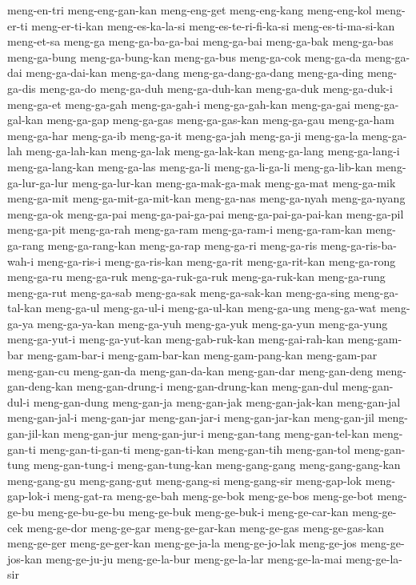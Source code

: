 {meng-en-tri meng-eng-gan-kan meng-eng-get meng-eng-kang meng-eng-kol
meng-er-ti meng-er-ti-kan meng-es-ka-la-si meng-es-te-ri-fi-ka-si
meng-es-ti-ma-si-kan meng-et-sa meng-ga meng-ga-ba-ga-bai meng-ga-bai
meng-ga-bak meng-ga-bas meng-ga-bung meng-ga-bung-kan meng-ga-bus
meng-ga-cok meng-ga-da meng-ga-dai meng-ga-dai-kan meng-ga-dang
meng-ga-dang-ga-dang meng-ga-ding meng-ga-dis meng-ga-do meng-ga-duh
meng-ga-duh-kan meng-ga-duk meng-ga-duk-i meng-ga-et meng-ga-gah
meng-ga-gah-i meng-ga-gah-kan meng-ga-gai meng-ga-gal-kan meng-ga-gap
meng-ga-gas meng-ga-gas-kan meng-ga-gau meng-ga-ham meng-ga-har meng-ga-ib
meng-ga-it meng-ga-jah meng-ga-ji meng-ga-la meng-ga-lah meng-ga-lah-kan
meng-ga-lak meng-ga-lak-kan meng-ga-lang meng-ga-lang-i meng-ga-lang-kan
meng-ga-las meng-ga-li meng-ga-li-ga-li meng-ga-lib-kan meng-ga-lur-ga-lur
meng-ga-lur-kan meng-ga-mak-ga-mak meng-ga-mat meng-ga-mik meng-ga-mit
meng-ga-mit-ga-mit-kan meng-ga-nas meng-ga-nyah meng-ga-nyang meng-ga-ok
meng-ga-pai meng-ga-pai-ga-pai meng-ga-pai-ga-pai-kan meng-ga-pil
meng-ga-pit meng-ga-rah meng-ga-ram meng-ga-ram-i meng-ga-ram-kan
meng-ga-rang meng-ga-rang-kan meng-ga-rap meng-ga-ri meng-ga-ris
meng-ga-ris-ba-wah-i meng-ga-ris-i meng-ga-ris-kan meng-ga-rit
meng-ga-rit-kan meng-ga-rong meng-ga-ru meng-ga-ruk meng-ga-ruk-ga-ruk
meng-ga-ruk-kan meng-ga-rung meng-ga-rut meng-ga-sab meng-ga-sak
meng-ga-sak-kan meng-ga-sing meng-ga-tal-kan meng-ga-ul meng-ga-ul-i
meng-ga-ul-kan meng-ga-ung meng-ga-wat meng-ga-ya meng-ga-ya-kan
meng-ga-yuh meng-ga-yuk meng-ga-yun meng-ga-yung meng-ga-yut-i
meng-ga-yut-kan meng-gab-ruk-kan meng-gai-rah-kan meng-gam-bar
meng-gam-bar-i meng-gam-bar-kan meng-gam-pang-kan meng-gam-par meng-gan-cu
meng-gan-da meng-gan-da-kan meng-gan-dar meng-gan-deng meng-gan-deng-kan
meng-gan-drung-i meng-gan-drung-kan meng-gan-dul meng-gan-dul-i
meng-gan-dung meng-gan-ja meng-gan-jak meng-gan-jak-kan meng-gan-jal
meng-gan-jal-i meng-gan-jar meng-gan-jar-i meng-gan-jar-kan meng-gan-jil
meng-gan-jil-kan meng-gan-jur meng-gan-jur-i meng-gan-tang
meng-gan-tel-kan meng-gan-ti meng-gan-ti-gan-ti meng-gan-ti-kan
meng-gan-tih meng-gan-tol meng-gan-tung meng-gan-tung-i meng-gan-tung-kan
meng-gang-gang meng-gang-gang-kan meng-gang-gu meng-gang-gut meng-gang-si
meng-gang-sir meng-gap-lok meng-gap-lok-i meng-gat-ra meng-ge-bah
meng-ge-bok meng-ge-bos meng-ge-bot meng-ge-bu meng-ge-bu-ge-bu
meng-ge-buk meng-ge-buk-i meng-ge-car-kan meng-ge-cek meng-ge-dor
meng-ge-gar meng-ge-gar-kan meng-ge-gas meng-ge-gas-kan meng-ge-ger
meng-ge-ger-kan meng-ge-ja-la meng-ge-jo-lak meng-ge-jos meng-ge-jos-kan
meng-ge-ju-ju meng-ge-la-bur meng-ge-la-lar meng-ge-la-mai meng-ge-la-sir
}

